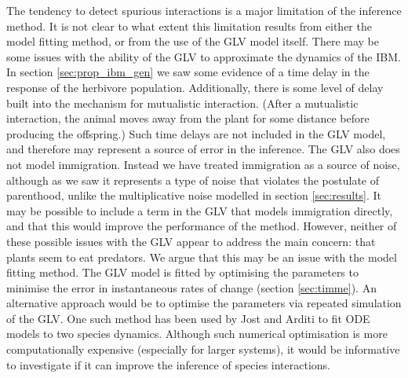 The tendency to detect spurious interactions is a major limitation of the inference method. It is not clear to what extent this limitation results from either the model fitting method, or from the use of the GLV model itself. There may be some issues with the ability of the GLV to approximate the dynamics of the IBM. In section \ref{sec:prop_ibm_gen} we saw some evidence of a time delay in the response of the herbivore population. Additionally, there is some level of delay built into the mechanism for mutualistic interaction. (After a mutualistic interaction, the animal moves away from the plant for some distance before producing the offspring.) Such time delays are not included in the GLV model, and therefore may represent a source of error in the inference. The GLV also does not model immigration. Instead we have treated immigration as a source of noise, although as we saw it represents a type of noise that violates the postulate of parenthood, unlike the multiplicative noise modelled in section \ref{sec:results}. It may be possible to include a term in the GLV that models immigration directly, and that this would improve the performance of the method. However, neither of these possible issues with the GLV appear to address the main concern: that plants seem to eat predators. We argue that this may be an issue with the model fitting method. The GLV model is fitted by optimising the parameters to minimise the error in instantaneous rates of change (section \ref{sec:timme}). An alternative approach would be to optimise the parameters via repeated simulation of the GLV. One such method has been used by Jost and Arditi \cite{jost2000identifying} to fit ODE models to two species dynamics. Although such numerical optimisation is more computationally expensive (especially for larger systems), it would be informative to investigate if it can improve the inference of species interactions.

